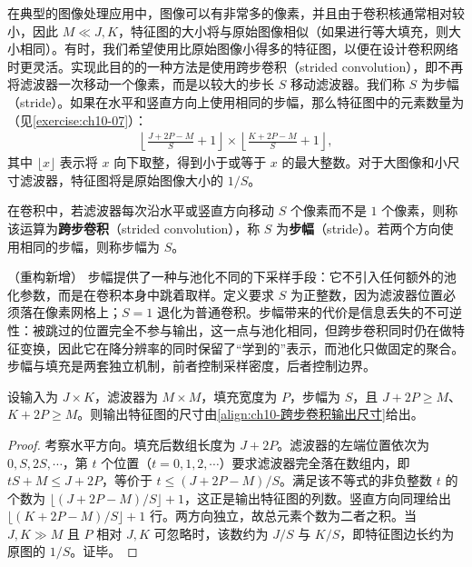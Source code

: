 \documentclass[../../main.tex]{subfiles}
\begin{document}
在典型的图像处理应用中，图像可以有非常多的像素，并且由于卷积核通常相对较小，因此 $M\ll J,K$，特征图的大小将与原始图像相似（如果进行等大填充，则大小相同）。有时，我们希望使用比原始图像小得多的特征图，以便在设计卷积网络时更灵活。实现此目的的一种方法是使用跨步卷积（strided convolution），即不再将滤波器一次移动一个像素，而是以较大的步长 $S$ 移动滤波器。我们称 $S$ 为步幅（stride）。如果在水平和竖直方向上使用相同的步幅，那么特征图中的元素数量为（见\cref{exercise:ch10-07}）：
\begin{align}
  \left\lfloor \frac{J+2P-M}{S}+1\right\rfloor
  \times
  \left\lfloor \frac{K+2P-M}{S}+1\right\rfloor,
  \label{align:ch10-跨步卷积输出尺寸}
\end{align}
其中 $\lfloor x\rfloor$ 表示将 $x$ 向下取整，得到小于或等于 $x$ 的最大整数。对于大图像和小尺寸滤波器，特征图将是原始图像大小的 $1/S$。

\begin{definition}[跨步卷积与步幅]\label{definition:ch10-跨步卷积}
在卷积中，若滤波器每次沿水平或竖直方向移动 $S$ 个像素而不是 $1$ 个像素，则称该运算为\textbf{跨步卷积}（strided convolution），称 $S$ 为\textbf{步幅}（stride）。若两个方向使用相同的步幅，则称步幅为 $S$。
\end{definition}

\begin{remark}（重构新增）
步幅提供了一种与池化不同的下采样手段：它不引入任何额外的池化参数，而是在卷积本身中跳着取样。定义要求 $S$ 为正整数，因为滤波器位置必须落在像素网格上；$S=1$ 退化为普通卷积。步幅带来的代价是信息丢失的不可逆性：被跳过的位置完全不参与输出，这一点与池化相同，但跨步卷积同时仍在做特征变换，因此它在降分辨率的同时保留了“学到的”表示，而池化只做固定的聚合。步幅与填充是两套独立机制，前者控制采样密度，后者控制边界。
\end{remark}

\begin{proposition}[跨步卷积的输出尺寸]\label{proposition:ch10-跨步卷积输出尺寸}
设输入为 $J\times K$，滤波器为 $M\times M$，填充宽度为 $P$，步幅为 $S$，且 $J+2P\geqslant M$、$K+2P\geqslant M$。则输出特征图的尺寸由\eqref{align:ch10-跨步卷积输出尺寸}给出。
\end{proposition}
\begin{proof}
考察水平方向。填充后数组长度为 $J+2P$。滤波器的左端位置依次为 $0,S,2S,\cdots$，第 $t$ 个位置（$t=0,1,2,\cdots$）要求滤波器完全落在数组内，即 $tS+M\leqslant J+2P$，等价于 $t\leqslant (J+2P-M)/S$。满足该不等式的非负整数 $t$ 的个数为 $\lfloor (J+2P-M)/S\rfloor+1$，这正是输出特征图的列数。竖直方向同理给出 $\lfloor (K+2P-M)/S\rfloor+1$ 行。两方向独立，故总元素个数为二者之积。当 $J,K\gg M$ 且 $P$ 相对 $J,K$ 可忽略时，该数约为 $J/S$ 与 $K/S$，即特征图边长约为原图的 $1/S$。证毕。
\end{proof}
\end{document}
